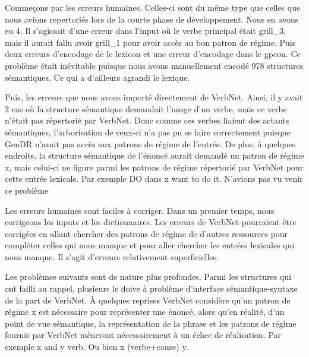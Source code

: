 Commeçons par les erreurs humaines. Celles-ci sont du même type que celles que nous avions repertoriés lors de la courte phase de développement. Nous en avons eu 4. Il s'agissait d'une erreur dans l'input où le verbe principal était grill\_3, mais il aurait fallu avoir grill\_1 pour avoir accès au bon patron de régime. Puis deux erreurs d'encodage de le lexicon et une erreur d'encodage dans le gpcon. Ce problème était inévitable puisque nous avons manuellement encodé 978 structures sémantiques. Ce qui a d'ailleurs agrandi le lexique.

Puis, les erreurs que nous avons importé directement de VerbNet. Ainsi, il y avait 2 cas où la structure sémantique demandait l'usage d'un verbe, mais ce verbe n'était pas répertorié par VerbNet. Donc comme ces verbes liaient des actants sémantiques, l'arborisation de ceux-ci n'a pas pu se faire correctement puisque GenDR n'avait pas accès aux patrons de régime de l'entrée. De plus, à quelques endroits, la structure sémantique de l'énoncé aurait demandé un patron de régime x, mais celui-ci ne figure parmi les patrons de régime répertorié par VerbNet pour cette entrée lexicale. Par exemple DO dans x want to do it. N'avions pas vu venir ce problème

Les erreurs humaines sont faciles à corriger. Dans un premier temps, nous corrigeons les inputs et les dictionnaires. Les erreurs de VerbNet pourraient être corrigées en allant chercher des patrons de régime de d'autres ressources pour compléter celles qui nous manque et pour aller chercher les entrées lexicales qui nous manque. Il s'agit d'erreurs relativement superficielles.

Les problèmes suivants sont de nature plus profondes. Parmi les structures qui ont failli au rappel, plusieurs le doive à problème d'interface sémantique-syntaxe de la part de VerbNet. À quelques reprises VerbNet considère qu'un patron de régime x est nécessaire pour représenter une énoncé, alors qu'en réalité, d'un point de vue sémantique, la représentation de la phrase et les patrons de régime fournis par VerbNet mèneront nécessairement à un échec de réalisation. Par exemple x and y verb. Ou bien x (verbe+cause) y.

